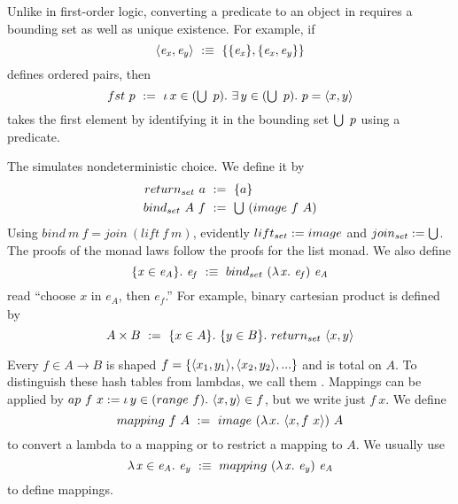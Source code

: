 Unlike in first-order logic, converting a predicate to an object in \targetlang requires a bounding set as well as unique existence. For example, if
\begin{equation}
	\pair{\mathit{e_x},\mathit{e_y}}\ \objstx\ \set{\set{\mathit{e_x}}, \set{\mathit{e_x},\mathit{e_y}}}
\end{equation}
defines ordered pairs, then
\begin{equation}
	fst~p\ \objdef\ \The{x \in (\U~p)} \Exists{y \in (\U~p)} p = \pair{x,y}
\end{equation}
takes the first element by identifying it in the bounding set $\textstyle\bigcup~p$ using a predicate.

The  simulates nondeterministic choice. We define it by
\begin{equation}
\begin{aligned}
	return_{set}~a &\ :=\ \{{a}\} \\
	bind_{set}~A~f &\ :=\ \textstyle\bigcup~(image~f~A)
\end{aligned}
\end{equation}
Using $bind~m~f = join~(lift~f~m)$, evidently $lift_{set} := image$ and $join_{set} := \textstyle\bigcup$.
The proofs of the monad laws follow the proofs for the list monad.
We also define
\begin{equation}
	\{{\mathit{x} \in \mathit{e_A}}\}\ldotp\, \mathit{e_f}\ :\equiv\ bind_{set}~(\lambda\mspace{2mu}{\mathit{x}}\ldotp\, \mathit{e_f})~\mathit{e_A}
\end{equation}
read ``choose $\mathit{x}$ in $\mathit{e_A}$, then $\mathit{e_f}$.''
For example, binary cartesian product is defined by
\begin{equation}
	A \times B\ :=\ \{{x \in A}\}\ldotp\, \{{y \in B}\}\ldotp\, return_{set}~\langle{x,y}\rangle
\end{equation}

Every $f \in A \to B$ is shaped $f = \{{\langle{x_1,y_1}\rangle,\langle{x_2,y_2}\rangle,...}\}$ and is total on $A$.
To distinguish these hash tables from lambdas, we call them .
Mappings can be applied by $ap~f~x := \iota\,{y \in (range~f)}\ldotp\, \langle{x,y}\rangle \in f$, but we write just $f~x$.
We define
\begin{equation}
	mapping~f~A\ \objdef\ image~(\fun{x} \pair{x,f~x})~A
\end{equation}
to convert a lambda to a mapping or to restrict a mapping to $A$.
We usually use
\begin{equation}
	\lambda\mspace{2mu}{\mathit{x} \in \mathit{e_A}}\ldotp\, \mathit{e_y}\ :\equiv\ mapping~(\lambda\mspace{2mu}{\mathit{x}}\ldotp\, \mathit{e_y})~\mathit{e_A}
\end{equation}
to define mappings.

